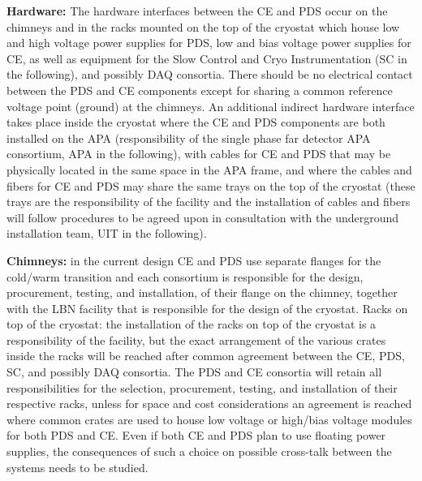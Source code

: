 \hspace{0.5cm}\textbf{Hardware: }The hardware interfaces between the CE and PDS occur on the chimneys and in the racks mounted on the top of the cryostat which house low and high voltage power supplies for PDS, low and bias voltage power supplies for CE, as well as equipment for the Slow Control and Cryo Instrumentation (SC in the following), and possibly DAQ consortia. There should be no electrical contact between the PDS and CE components except for sharing a common reference voltage point (ground) at the chimneys. An additional indirect hardware interface takes place inside the cryostat where the CE and PDS components are both installed on the APA (responsibility of the single phase far detector APA consortium, APA in the following), with cables for CE and PDS that may be physically located in the same space in the APA frame, and where the cables and fibers for CE and PDS may share the same trays on the top of the cryostat (these trays are the responsibility of the facility and the installation of cables and fibers will follow procedures to be agreed upon in consultation with the underground installation team, UIT in the following).

\textbf{Chimneys: }in the current design CE and PDS use separate flanges for the cold/warm transition and each consortium is responsible for the design, procurement, testing, and installation, of their flange on the chimney, together with the LBN facility that is responsible for the design of the cryostat.
Racks on top of the cryostat: the installation of the racks on top of the cryostat is a responsibility of the facility, but the exact arrangement of the various crates inside the racks will be reached after common agreement between the CE, PDS, SC, and possibly DAQ consortia. The PDS and CE consortia will retain all responsibilities for the selection, procurement, testing, and installation of their respective racks, unless for space and cost considerations an agreement is reached where common crates are used to house low voltage or high/bias voltage modules for both PDS and CE. Even if both CE and PDS plan to use floating power supplies, the consequences of such a choice on possible cross-talk between the systems needs to be studied. 

